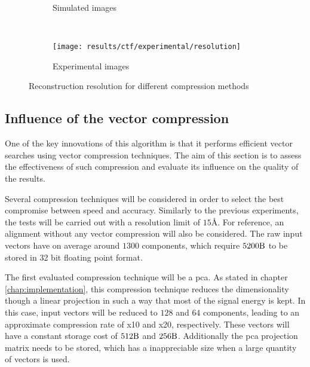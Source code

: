 \documentclass[../main.tex]{subfiles}
\begin{document}
\begin{figure}[htbp]
    \centering
    \begin{subfigure}[b]{.8\textwidth}
         \centering
         \caption{Simulated images}
    \end{subfigure}\\
    \vspace{2em}
    \begin{subfigure}[b]{.8\textwidth}
         \centering
         \texttt{[image: results/ctf/experimental/resolution]}
         \caption{Experimental images}
    \end{subfigure}
    \caption{Reconstruction resolution for different compression methods}
    \label{fig:5:ctf_resolution}
\end{figure}

\subsection{Influence of the vector compression}
One of the key innovations of this algorithm is that it performs efficient vector searches using vector compression techniques. The aim of this section is to assess the effectiveness of such compression and evaluate its influence on the quality of the results.

Several compression techniques will be considered in order to select the best compromise between speed and accuracy. Similarly to the previous experiments, the tests will be carried out with a resolution limit of $15 \si{\angstrom}$. For reference, an alignment without any vector compression will also be considered. The raw input vectors have on average around $1300$ components, which require $5200 \si{\byte}$ to be stored in 32 bit floating point format.

The first evaluated compression technique will be a \gls{pca}. As stated in chapter \ref{chap:implementation}, this compression technique reduces the dimensionality though a linear projection in such a way that most of the signal energy is kept. In this case, input vectors will be reduced to $128$ and $64$ components, leading to an approximate compression rate of x10 and x20, respectively. These vectors will have a constant storage cost of $512\si{\byte}$ and $256\si{\byte}$. Additionally the \gls{pca} projection matrix needs to be stored, which has a inappreciable size when a large quantity of vectors is used.
\end{document}
